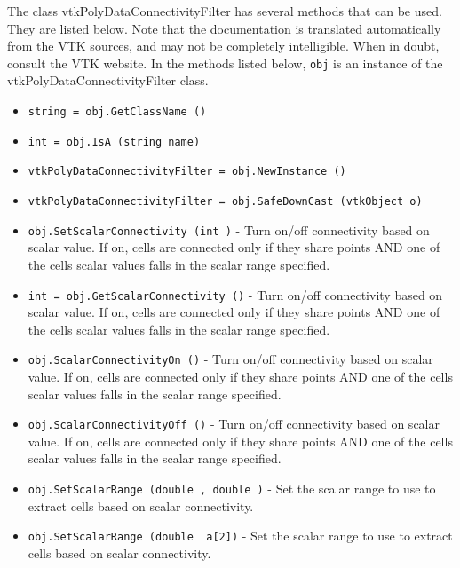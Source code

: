 The class vtkPolyDataConnectivityFilter has several methods that can be used.
  They are listed below.
Note that the documentation is translated automatically from the VTK sources,
and may not be completely intelligible.  When in doubt, consult the VTK website.
In the methods listed below, \verb|obj| is an instance of the vtkPolyDataConnectivityFilter class.
\begin{itemize}
\item  \verb|string = obj.GetClassName ()|

\item  \verb|int = obj.IsA (string name)|

\item  \verb|vtkPolyDataConnectivityFilter = obj.NewInstance ()|

\item  \verb|vtkPolyDataConnectivityFilter = obj.SafeDownCast (vtkObject o)|

\item  \verb|obj.SetScalarConnectivity (int )| -  Turn on/off connectivity based on scalar value. If on, cells are connected
 only if they share points AND one of the cells scalar values falls in the
 scalar range specified.

\item  \verb|int = obj.GetScalarConnectivity ()| -  Turn on/off connectivity based on scalar value. If on, cells are connected
 only if they share points AND one of the cells scalar values falls in the
 scalar range specified.

\item  \verb|obj.ScalarConnectivityOn ()| -  Turn on/off connectivity based on scalar value. If on, cells are connected
 only if they share points AND one of the cells scalar values falls in the
 scalar range specified.

\item  \verb|obj.ScalarConnectivityOff ()| -  Turn on/off connectivity based on scalar value. If on, cells are connected
 only if they share points AND one of the cells scalar values falls in the
 scalar range specified.

\item  \verb|obj.SetScalarRange (double , double )| -  Set the scalar range to use to extract cells based on scalar connectivity.

\item  \verb|obj.SetScalarRange (double  a[2])| -  Set the scalar range to use to extract cells based on scalar connectivity.


\end{itemize}

